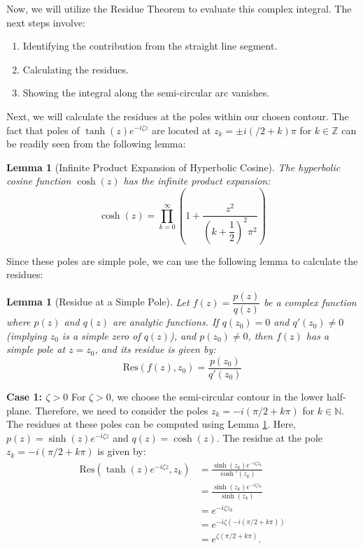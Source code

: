 \documentclass[a4paper,12pt]{article}
\newtheorem{lem}[thm]{Lemma}
\newcommand{\z}{\zeta}
\begin{document}
\bigskip

Now, we will utilize the Residue Theorem to evaluate this complex integral. 
The next steps involve:

\begin{enumerate}
  \item Identifying the contribution from the straight line segment.
  \item Calculating the residues.
  \item Showing the integral along the semi-circular arc vanishes.
\end{enumerate}

Next, we will calculate the residues at the poles within our chosen contour. The fact that poles of $\tanh(z)e^{-i\zeta z}$ are located at $z_k = \pm i (/2 + k)\pi$ for $k \in \mathbb{Z}$ can be readily seen from the following lemma:

\begin{lem}[Infinite Product Expansion of Hyperbolic Cosine]
The hyperbolic cosine function $\cosh(z)$ has the infinite product expansion:
$$ \cosh(z) = \prod_{k=0}^{\infty} \left(1 + \frac{z^2}{\left(k+\dfrac{1}{2}\right)^2\pi^2}\right) $$
\end{lem}

Since these poles are simple pole, we can use the following lemma to calculate the residues:

\begin{lem}[Residue at a Simple Pole] \label{lem:simple_pole_res}
Let $f(z) = \dfrac{p(z)}{q(z)}$ be a complex function where $p(z)$ and $q(z)$ are analytic functions. If $q(z_0) = 0$ and $q'(z_0) \neq 0$ (implying $z_0$ is a simple zero of $q(z)$), and $p(z_0) \neq 0$, then $f(z)$ has a simple pole at $z=z_0$, and its residue is given by:
$$ \text{Res}(f(z), z_0) = \frac{p(z_0)}{q'(z_0)} $$
\end{lem}

\textbf{Case 1: $\zeta > 0$}
For $\z > 0$, we choose the semi-circular contour in the lower half-plane. Therefore, we need to consider the poles $z_k = -i (\pi/2 + k\pi)$ for $k \in \mathbb{N}$.
The residues at these poles can be computed using Lemma \ref{lem:simple_pole_res}. Here, $p(z) = \sinh(z)e^{-i \z z}$ and $q(z) = \cosh(z)$.
The residue at the pole $z_k = -i (\pi/2 + k\pi)$ is given by:
\begin{align*}
  \text{Res}(\tanh(z)e^{-i \z z}, z_k) &= \frac{\sinh(z_k)e^{-i \z z_k}}{\cosh'(z_k)} \\
  &=\frac{\sinh(z_k)e^{-i \z z_k}}{\sinh(z_k)}\\
  &= e^{-i \z z_k} \\
  &= e^{-i \z (-i (\pi/2 + k\pi))}\\
  &= e^{\z (\pi/2 + k\pi)}.
\end{align*}
\end{document}
